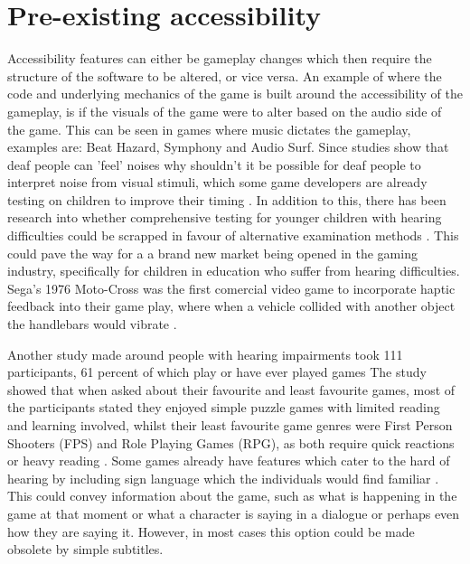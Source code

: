 \documentclass{scrartcl}
\begin{document}
\section{Pre-existing accessibility}
Accessibility features can either be gameplay changes which then require the structure of the software to be altered, or vice versa. An example of where the code and underlying mechanics of the game is built around the accessibility of the gameplay, is if the visuals of the game were to alter based on the audio side of the game. This can be seen in games where music dictates the gameplay, examples are: Beat Hazard\cite {game:beathazard}, Symphony\cite {game:symphony} and Audio Surf\cite {game:audiosurf}. Since studies show that deaf people can 'feel' noises \cite {Nanayakkara} why shouldn't it be possible for deaf people to interpret noise from visual stimuli, which some game developers are already testing on children to improve their timing  \cite {Jouhtimaki}. In addition to this, there has been research into whether comprehensive testing for younger children with hearing difficulties could be scrapped in favour of alternative examination methods \cite{Mich}. This could pave the way for a a brand new market being opened in the gaming industry, specifically for children in education who suffer from hearing difficulties. Sega's 1976 Moto-Cross was the first comercial video game to incorporate haptic feedback into their game play, where when a vehicle collided with another object the handlebars would vibrate \cite {Sega}. 

 Another study made around people with hearing impairments took 111 participants, 61 percent of which play or have ever played games\cite {Coutinho} The study showed that when asked about their favourite and least favourite games, most of the participants stated they enjoyed simple puzzle games with limited reading and learning involved, whilst their least favourite game genres were First Person Shooters (FPS) and Role Playing Games (RPG), as both require quick reactions or heavy reading \cite {Coutinho}. Some games already have features which cater to the hard of hearing by including sign language which the individuals would find familiar \cite{Bouzid}. This could convey information about the game, such as what is happening in the game at that moment or what a character is saying in a dialogue or perhaps even how they are saying it. However, in most cases this option could be made obsolete by simple subtitles.
\end{document}
